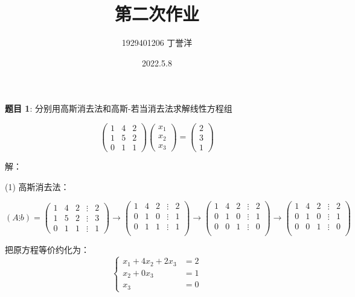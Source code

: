 \documentclass{article}
\title{第二次作业}
\author{1929401206 丁誉洋}
\date{2022.5.8}
\begin{document}
\maketitle


\noindent\textbf{题目 1}: 分别用高斯消去法和高斯-若当消去法求解线性方程组

$$
\begin{pmatrix}
    1 & 4 & 2 \\
    1 & 5 & 2 \\
    0 & 1 & 1
\end{pmatrix}
\begin{pmatrix}
    x_1 \\
    x_2 \\
    x_3
\end{pmatrix}
=
\begin{pmatrix}
    2 \\
    3 \\
    1
\end{pmatrix}
$$

\noindent 解：

\noindent (1) 高斯消去法：

$$
(A\vdots b)
=
\begin{pmatrix}
    1 & 4 & 2 & \vdots & 2 \\
    1 & 5 & 2 & \vdots & 3 \\
    0 & 1 & 1 & \vdots & 1
\end{pmatrix}
\longrightarrow
\begin{pmatrix}
    1 & 4 & 2 & \vdots & 2 \\
    0 & 1 & 0 & \vdots & 1 \\
    0 & 1 & 1 & \vdots & 1 \\
\end{pmatrix}
\longrightarrow
\begin{pmatrix}
    1 & 4 & 2 & \vdots & 2 \\
    0 & 1 & 0 & \vdots & 1 \\
    0 & 0 & 1 & \vdots & 0 \\
\end{pmatrix}
\longrightarrow
\begin{pmatrix}
    1 & 4 & 2 & \vdots & 2 \\
    0 & 1 & 0 & \vdots & 1 \\
    0 & 0 & 1 & \vdots & 0 \\
\end{pmatrix}
$$

把原方程等价约化为：
$$
\left\{
\begin{aligned}
    x_1 + 4x_2 + 2x_3 &= 2 \\
    x_2 + 0x_3 &= 1 \\
    x_3 &= 0
\end{aligned}
\right.
$$
\end{document}

